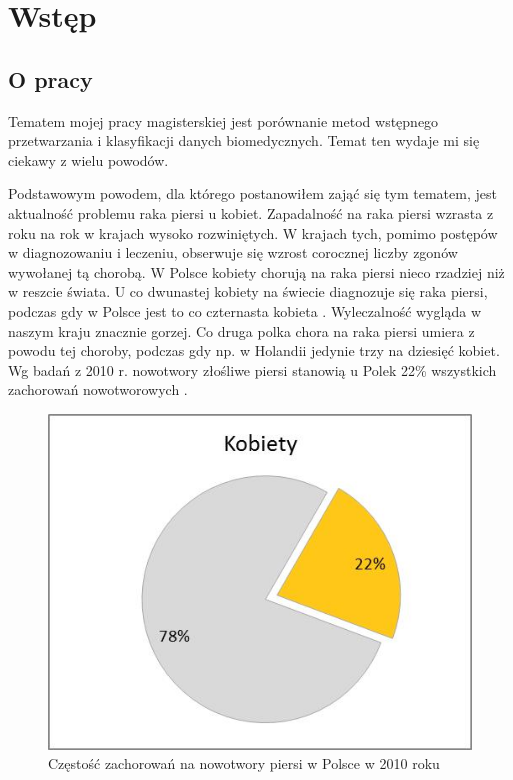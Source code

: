 \documentclass[../thesis.tex]{subfiles}
\begin{document}
\pagestyle{plain}

\chapter{Wstęp}
\label{intro}

\section{O pracy}

Tematem mojej pracy magisterskiej jest porównanie metod wstępnego przetwarzania i klasyfikacji danych biomedycznych. Temat ten wydaje mi się ciekawy z wielu powodów.

Podstawowym powodem, dla którego postanowiłem zająć się tym tematem, jest aktualność problemu raka piersi u kobiet. Zapadalność na raka piersi wzrasta z roku na rok w krajach wysoko rozwiniętych. W krajach tych, pomimo postępów w diagnozowaniu i leczeniu, obserwuje się wzrost corocznej liczby zgonów wywołanej tą chorobą. W Polsce kobiety chorują na raka piersi nieco rzadziej niż w reszcie świata. U co dwunastej kobiety na świecie diagnozuje się raka piersi, podczas gdy w Polsce jest to co czternasta kobieta \cite{cancer_web_a}.  Wyleczalność wygląda w naszym kraju znacznie gorzej. Co druga polka chora na raka piersi umiera z powodu tej choroby, podczas gdy np. w Holandii jedynie trzy na dziesięć kobiet. Wg badań z 2010 r. nowotwory złośliwe piersi stanowią u Polek 22\% wszystkich zachorowań nowotworowych \cite{cancer_web_b}.

\begin{figure}[h]
\centering
\includegraphics{zachorowalnosc.jpg}
\caption{Częstość zachorowań na nowotwory piersi w Polsce w 2010 roku}
\label{intro:cancer_chart}
\end{figure}
\end{document}
